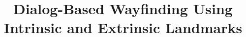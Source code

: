 \documentclass{iitkthesis}
\begin{document}

\title{Dialog-Based Wayfinding Using Intrinsic and Extrinsic Landmarks}
%
%
%
%
%
\end{document}
